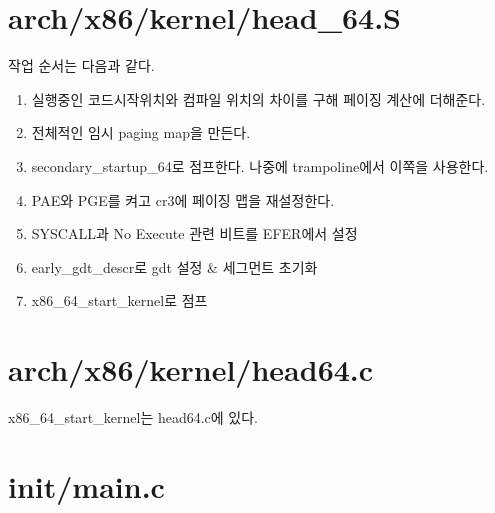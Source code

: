 \documentclass[a4paper,11pt]{report}
\begin{document}
\begin{CJK}{UTF8}{}
\section{arch/x86/kernel/head\_64.S}
작업 순서는 다음과 같다.
\begin{enumerate}
\item 실행중인 코드시작위치와 컴파일 위치의 차이를 구해 페이징 계산에 더해준다.
\item 전체적인 임시 paging map을 만든다.
\item secondary\_startup\_64로 점프한다. 나중에 trampoline에서 이쪽을 사용한다.
\item PAE와 PGE를 켜고 cr3에 페이징 맵을 재설정한다.
\item SYSCALL과 No Execute 관련 비트를 EFER에서 설정
\item early\_gdt\_descr로 gdt 설정 & 세그먼트 초기화
\item x86\_64\_start\_kernel로 점프
\end{enumerate}
\section{arch/x86/kernel/head64.c}
x86\_64\_start\_kernel는 head64.c에 있다.
\section{init/main.c}



\end{CJK}
\end{document}
